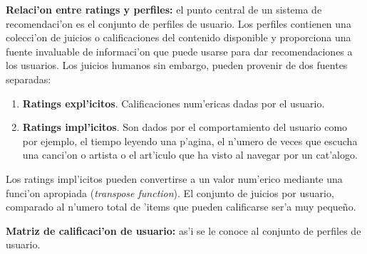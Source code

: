 \documentclass[11pt]{article}
\begin{document}
\smallskip
\textbf{Relaci'on entre ratings y perfiles:} el punto central de un sistema de recomendaci'on es el conjunto de perfiles de usuario. Los perfiles contienen una colecci'on de juicios o calificaciones del contenido disponible y proporciona una fuente invaluable de informaci'on que puede usarse para dar recomendaciones a los usuarios. Los juicios humanos sin embargo, pueden provenir de dos fuentes separadas:
\begin{enumerate}
\item \textbf{Ratings expl'icitos}. Calificaciones num'ericas dadas por el usuario.
\item \textbf{Ratings impl'icitos}. Son dados por el comportamiento del usuario como por ejemplo, el tiempo leyendo una p'agina, el n'umero de veces que escucha una canci'on o artista o el art'iculo que ha visto al navegar por un cat'alogo.
\end{enumerate}

Los ratings impl'icitos pueden convertirse a un valor num'erico mediante una funci'on apropiada (\textit{transpose function}). El conjunto de juicios por usuario, comparado al n'umero total de 'items que pueden calificarse ser'a muy peque\~{n}o.

\smallskip
\textbf{Matriz de calificaci'on de usuario:} as'i se le conoce al conjunto de perfiles de usuario.




\end{document}
